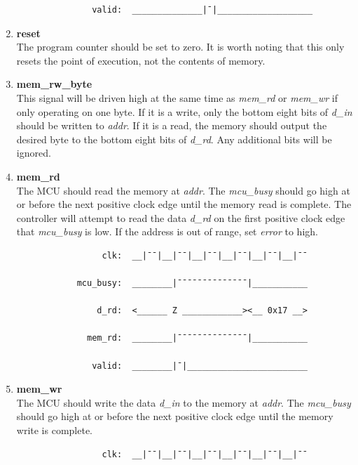\documentclass[10pt,a4paper]{article}
\begin{document}
\begin{enumerate}
\begin{verbatim}
               valid:  ______________|¯|___________________
        \end{verbatim}

    \item\textbf{reset}\\
    The program counter should be set to zero. It is worth noting that this only resets the point of
    execution, not the contents of memory.

    \item\textbf{mem\_rw\_byte}\\
    This signal will be driven high at the same time as \emph{mem\_rd} or \emph{mem\_wr} if only
    operating on one byte. If it is a write, only the bottom eight bits of \emph{d\_in} should be
    written to \emph{addr}. If it is a read, the memory should output the desired byte to the
    bottom eight bits of \emph{d\_rd}. Any additional bits will be ignored.

    \newpage
    \item\textbf{mem\_rd}\\
    The MCU should read the memory at \emph{addr}. The \emph{mcu\_busy} should go
     high at or before the next positive clock edge until the memory read is complete. The
    controller will attempt to read the data \emph{d\_rd} on the first positive clock edge that
    \emph{mcu\_busy} is low. If the address is out of range, set \emph{error} to high.

        \begin{verbatim}
                 clk:  __|¯¯|__|¯¯|__|¯¯|__|¯¯|__|¯¯|__|¯¯

            mcu_busy:  ________|¯¯¯¯¯¯¯¯¯¯¯¯¯¯|___________

                d_rd:  <______ Z ____________><__ 0x17 __>

              mem_rd:  ________|¯¯¯¯¯¯¯¯¯¯¯¯¯¯|___________

               valid:  ________|¯|________________________
        \end{verbatim}

    \item\textbf{mem\_wr}\\
    The MCU should write the data \emph{d\_in} to the memory at \emph{addr}. The \emph{mcu\_busy}
    should go high at or before the next positive clock edge until the memory write is complete.

        \begin{verbatim}
                 clk:  __|¯¯|__|¯¯|__|¯¯|__|¯¯|__|¯¯|__|¯¯


\end{verbatim}
\end{enumerate}
\end{document}
